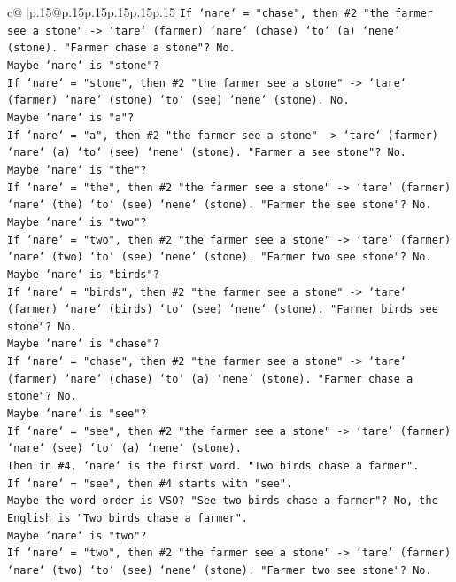 \documentclass{article}
\begin{document}
{\begin{supertabular}{c@{$\;$}|p{.15\linewidth}@{}p{.15\linewidth}p{.15\linewidth}p{.15\linewidth}p{.15\linewidth}p{.15\linewidth}}
{{{\texttt{If `nare` = "chase", then \#2 "the farmer see a stone" {-}> `tare` (farmer) `nare` (chase) `to` (a) `nene` (stone). "Farmer chase a stone"? No.} \\
\texttt{Maybe `nare` is "stone"?} \\
\texttt{If `nare` = "stone", then \#2 "the farmer see a stone" {-}> `tare` (farmer) `nare` (stone) `to` (see) `nene` (stone). No.} \\
\texttt{Maybe `nare` is "a"?} \\
\texttt{If `nare` = "a", then \#2 "the farmer see a stone" {-}> `tare` (farmer) `nare` (a) `to` (see) `nene` (stone). "Farmer a see stone"? No.} \\
\texttt{Maybe `nare` is "the"?} \\
\texttt{If `nare` = "the", then \#2 "the farmer see a stone" {-}> `tare` (farmer) `nare` (the) `to` (see) `nene` (stone). "Farmer the see stone"? No.} \\
\texttt{Maybe `nare` is "two"?} \\
\texttt{If `nare` = "two", then \#2 "the farmer see a stone" {-}> `tare` (farmer) `nare` (two) `to` (see) `nene` (stone). "Farmer two see stone"? No.} \\
\texttt{Maybe `nare` is "birds"?} \\
\texttt{If `nare` = "birds", then \#2 "the farmer see a stone" {-}> `tare` (farmer) `nare` (birds) `to` (see) `nene` (stone). "Farmer birds see stone"? No.} \\
\texttt{Maybe `nare` is "chase"?} \\
\texttt{If `nare` = "chase", then \#2 "the farmer see a stone" {-}> `tare` (farmer) `nare` (chase) `to` (a) `nene` (stone). "Farmer chase a stone"? No.} \\
\texttt{Maybe `nare` is "see"?} \\
\texttt{If `nare` = "see", then \#2 "the farmer see a stone" {-}> `tare` (farmer) `nare` (see) `to` (a) `nene` (stone).} \\
\texttt{Then in \#4, `nare` is the first word. "Two birds chase a farmer".} \\
\texttt{If `nare` = "see", then \#4 starts with "see".} \\
\texttt{Maybe the word order is VSO? "See two birds chase a farmer"? No, the English is "Two birds chase a farmer".} \\
\texttt{Maybe `nare` is "two"?} \\
\texttt{If `nare` = "two", then \#2 "the farmer see a stone" {-}> `tare` (farmer) `nare` (two) `to` (see) `nene` (stone). "Farmer two see stone"? No.} \\
}}}
\end{supertabular}}
\end{document}
